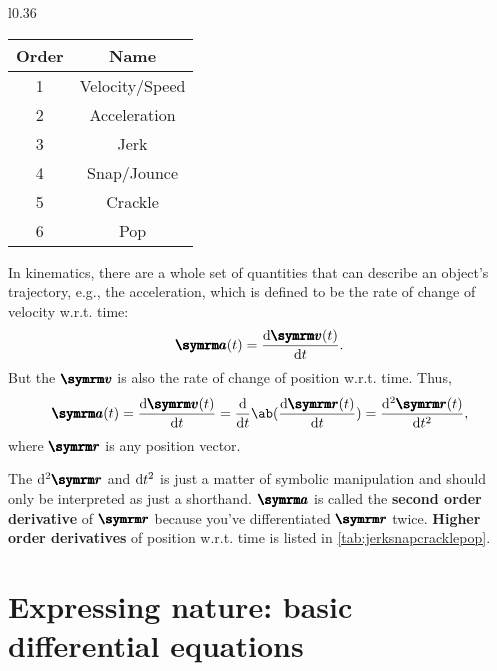 \begin{wraptable}[13]{l}{0.36\textwidth}
    \begin{tabular}{c | c}
        Order & Name \\
        \hline
        1 & Velocity/Speed \\
        2 & Acceleration \\
        3 & Jerk \\
        4 & Snap/Jounce \\
        5 & Crackle \\
        6 & Pop
    \end{tabular}
    \caption{Higher order derivatives of position w.r.t. time}
    \label{tab:jerksnapcracklepop}
\end{wraptable}
In kinematics, there are a whole set of quantities that can describe an object's trajectory, e.g., the acceleration, which is defined to be the rate of change of velocity w.r.t. time:
\begin{equation*}
    \vv{a}(t) = \odv{\vv{v}(t)}{t}.
\end{equation*}
But the $\vv{v}$ is also the rate of change of position w.r.t. time. Thus,
\begin{equation*}
    \vv{a}(t) = \odv{\vv{v}(t)}{t} = \odv*{\ab(\odv{\vv{r}(t)}{t})}{t} = \odv[ord = 2]{\vv{r}(t)}{t}, 
\end{equation*}
where $\vv{r}$ is any position vector.

The $\odif[ord = 2]{\vv{r}}$ and $\odif{t}^2$ is just a matter of symbolic manipulation and should only be interpreted as just a shorthand. $\vv{a}$ is called the \textbf{second order derivative} of $\vv{r}$ because you've differentiated $\vv{r}$ twice. \textbf{Higher order derivatives} of position w.r.t. time is listed in \cref{tab:jerksnapcracklepop}.

\section{Expressing nature: basic differential equations}
\label{sec:basicdifferentialequations}

